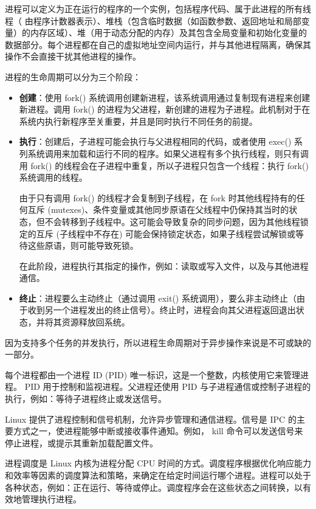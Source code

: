 
进程可以定义为正在运行的程序的一个实例，包括程序代码、属于此进程的所有线程（ 由程序计数器表示）、堆栈（包含临时数据（如函数参数、返回地址和局部变量）的内存区域）、堆（用于动态分配的内存）及其包含全局变量和初始化变量的数据部分。每个进程都在自己的虚拟地址空间内运行，并与其他进程隔离，确保其操作不会直接干扰其他进程的操作。


进程的生命周期可以分为三个阶段：

\begin{itemize}
\item
\textbf{创建}：使用 fork() 系统调用创建新进程，该系统调用通过复制现有进程来创建新进程。调用 fork() 的进程为父进程，新创建的进程为子进程。此机制对于在系统内执行新程序至关重要，并且是同时执行不同任务的前提。

\item
\textbf{执行}：创建后，子进程可能会执行与父进程相同的代码，或者使用 exec() 系列系统调用来加载和运行不同的程序。如果父进程有多个执行线程，则只有调用 fork() 的线程会在子进程中重复，所以子进程只包含一个线程：执行 fork() 系统调用的线程。

由于只有调用 fork() 的线程才会复制到子线程，在 fork 时其他线程持有的任何互斥 (mutexes)、条件变量或其他同步原语在父线程中仍保持其当时的状态，但不会转移到子线程中。这可能会导致复杂的同步问题，因为其他线程锁定的互斥 (子线程中不存在) 可能会保持锁定状态，如果子线程尝试解锁或等待这些原语，则可能导致死锁。

在此阶段，进程执行其指定的操作，例如：读取或写入文件，以及与其他进程通信。

\item
\textbf{终止}：进程要么主动终止（通过调用 exit() 系统调用），要么非主动终止（由于收到另一个进程发出的终止信号）。终止时，进程会向其父进程返回退出状态，并将其资源释放回系统。
\end{itemize}

因为支持多个任务的并发执行，所以进程生命周期对于异步操作来说是不可或缺的一部分。

每个进程都由一个进程 ID (PID) 唯一标识，这是一个整数，内核使用它来管理进程。 PID 用于控制和监视进程。父进程还使用 PID 与子进程通信或控制子进程的执行，例如：等待子进程终止或发送信号。

Linux 提供了进程控制和信号机制，允许异步管理和通信进程。信号是 IPC 的主要方式之一，使进程能够中断或接收事件通知。例如， kill 命令可以发送信号来停止进程，或提示其重新加载配置文件。

进程调度是 Linux 内核为进程分配 CPU 时间的方式。调度程序根据优化响应能力和效率等因素的调度算法和策略，来确定在给定时间运行哪个进程。进程可以处于各种状态，例如：正在运行、等待或停止。调度程序会在这些状态之间转换，以有效地管理执行进程。

